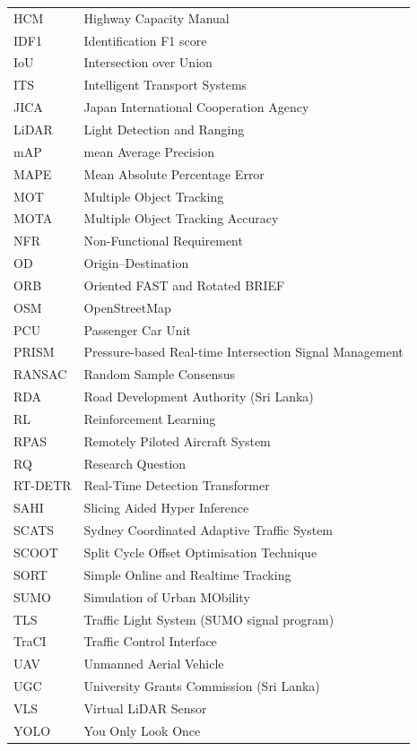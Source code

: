\begin{longtable}{@{}p{}p{}@{}}
HCM & Highway Capacity Manual\\
IDF1 & Identification F1 score\\
IoU & Intersection over Union\\
ITS & Intelligent Transport Systems\\
JICA & Japan International Cooperation Agency\\
LiDAR & Light Detection and Ranging\\
mAP & mean Average Precision\\
MAPE & Mean Absolute Percentage Error\\
MOT & Multiple Object Tracking\\
MOTA & Multiple Object Tracking Accuracy\\
NFR & Non-Functional Requirement\\
OD & Origin--Destination\\
ORB & Oriented FAST and Rotated BRIEF\\
OSM & OpenStreetMap\\
PCU & Passenger Car Unit\\
PRISM & Pressure-based Real-time Intersection Signal Management\\
RANSAC & Random Sample Consensus\\
RDA & Road Development Authority (Sri Lanka)\\
RL & Reinforcement Learning\\
RPAS & Remotely Piloted Aircraft System\\
RQ & Research Question\\
RT-DETR & Real-Time Detection Transformer\\
SAHI & Slicing Aided Hyper Inference\\
SCATS & Sydney Coordinated Adaptive Traffic System\\
SCOOT & Split Cycle Offset Optimisation Technique\\
SORT & Simple Online and Realtime Tracking\\
SUMO & Simulation of Urban MObility\\
TLS & Traffic Light System (SUMO signal program)\\
TraCI & Traffic Control Interface\\
UAV & Unmanned Aerial Vehicle\\
UGC & University Grants Commission (Sri Lanka)\\
VLS & Virtual LiDAR Sensor\\
YOLO & You Only Look Once\\
\end{longtable}
\renewcommand{\arraystretch}{1.0}
